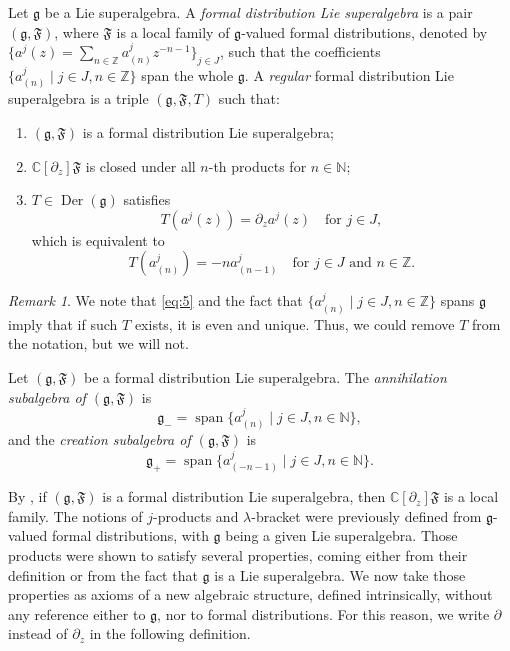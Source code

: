 \documentclass[a4paper, 12pt, reqno]{amsart}
\theoremstyle{remark}
\newtheorem{remark}[theorem]{Remark}
\DeclareMathOperator{\vspan}{span}
\DeclareMathOperator{\Der}{Der}
\begin{document}
Let $\mathfrak{g}$ be a Lie superalgebra.
A \emph{formal distribution Lie superalgebra} is a pair $(\mathfrak{g}, \mathfrak{F})$, where $\mathfrak{F}$ is a local family of $\mathfrak{g}$-valued formal distributions, denoted by $\{a^j(z) = \sum_{n \in \mathbb{Z}}a^j_{(n)}z^{-n - 1}\}_{j \in J}$, such that the coefficients $\{a^j_{(n)} \mid j \in J, n \in \mathbb{Z}\}$ span the whole $\mathfrak{g}$.
A \emph{regular} formal distribution Lie superalgebra is a triple $(\mathfrak{g}, \mathfrak{F}, T)$ such that:
\begin{enumerate}
\item $(\mathfrak{g}, \mathfrak{F})$ is a formal distribution Lie superalgebra;
\item $\mathbb{C}[\partial_z]\mathfrak{F}$ is closed under all $n$-th products for $n \in \mathbb{N}$;
\item $T \in \Der(\mathfrak{g})$ satisfies
  \begin{equation*}
    T(a^j(z)) = \partial_za^j(z) \quad \text{for $j \in J$},
  \end{equation*}
  which is equivalent to
  \begin{equation}
    \label{eq:5}
    T(a^j_{(n)}) = -na^j_{(n - 1)} \quad \text{for $j \in J$ and $n \in \mathbb{Z}$}.
  \end{equation}
\end{enumerate}

\begin{remark}
  \label{rmk:6}
  We note that \eqref{eq:5} and the fact that $\{a^j_{(n)} \mid j \in J, n \in \mathbb{Z}\}$ spans $\mathfrak{g}$ imply that if such $T$ exists, it is even and unique.
  Thus, we could remove $T$ from the notation, but we will not.
\end{remark}

Let $(\mathfrak{g}, \mathfrak{F})$ be a formal distribution Lie superalgebra.
The \emph{annihilation subalgebra of $(\mathfrak{g}, \mathfrak{F})$} is
\begin{equation*}
  \mathfrak{g}_- = \vspan\{a^j_{(n)} \mid j \in J, n \in \mathbb{N}\},
\end{equation*}
and the \emph{creation subalgebra of $(\mathfrak{g}, \mathfrak{F})$} is
\begin{equation*}
  \mathfrak{g}_+ = \vspan\{a^j_{(-n - 1)} \mid j \in J, n \in \mathbb{N}\}.
\end{equation*}

By , if $(\mathfrak{g}, \mathfrak{F})$ is a formal distribution Lie superalgebra, then $\mathbb{C}[\partial_z]\mathfrak{F}$ is a local family.
The notions of $j$-products and $\lambda$-bracket were previously defined from $\mathfrak{g}$-valued formal distributions, with $\mathfrak{g}$ being a given Lie superalgebra.
Those products were shown to satisfy several properties, coming either from their definition or from the fact that $\mathfrak{g}$ is a Lie superalgebra.
We now take those properties as axioms of a new algebraic structure, defined intrinsically, without any reference either to $\mathfrak{g}$, nor to formal distributions.
For this reason, we write $\partial$ instead of $\partial_z$ in the following definition.
\end{document}
